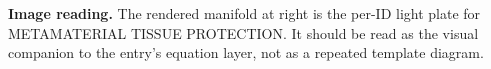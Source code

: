 \begin{samepage}
\noindent\begin{minipage}[t]{0.45\linewidth}
\vspace{0pt}
\raggedright
\scriptsize\textbf{Image reading.} The rendered manifold at right is the per-ID light plate for METAMATERIAL TISSUE PROTECTION. It should be read as the visual companion to the entry's equation layer, not as a repeated template diagram.\par
\end{minipage}\hfill
\begin{minipage}[t]{0.53\linewidth}
\vspace*{-0.10in}
\raggedright
{}
\end{minipage}
\end{samepage}

\clearpage


